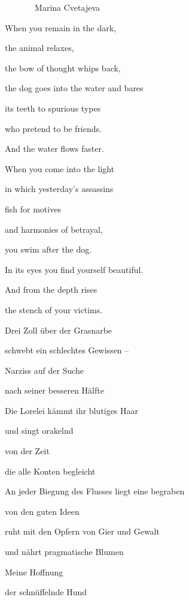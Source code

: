 \emph{\ \  \ \ \ \ \ }Marina Cvetajeva


\bigskip

When you remain in the dark,

the animal relaxes,

the bow of thought whips back,

the dog goes into the water and bares

its teeth to spurious types

who pretend to be friends.


\bigskip

And the water flows faster.


\bigskip


\bigskip

When you come into the light

in which yesterday's assassins

fish for motives

and harmonies of betrayal,

you swim after the dog.

In its eyes you find yourself beautiful.


\bigskip

And from the depth rises

the stench of your victims.


\bigskip



\bigskip

Drei Zoll über der Grasnarbe

schwebt ein schlechtes Gewissen -- 

Narziss auf der Suche

nach seiner besseren Hälfte


\bigskip

Die Lorelei kämmt ihr blutiges Haar

und singt orakelnd 

von der Zeit

die alle Konten begleicht


\bigskip

An jeder Biegung des Flusses liegt eine begraben

von den guten Ideen

ruht mit den Opfern von Gier und Gewalt

und nährt pragmatische Blumen


\bigskip

Meine Hoffnung

der schnüffelnde Hund

